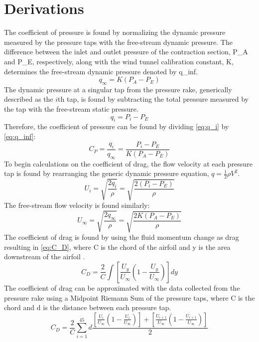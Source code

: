 \section{Derivations} \label{sec:derivations}
The coefficient of pressure is found by normalizing the dynamic pressure measured by the pressure taps with the free-stream dynamic pressure. The difference between the inlet and outlet pressure of the contraction section, \gls{P_A} and \gls{P_E}, respectively, along with the wind tunnel calibration constant, \gls{K}, determines the free-stream dynamic pressure denoted by \gls{q_inf}.
\begin{equation}\label{eq:q_inf}
    q_\infty = K (P_A - P_E)
\end{equation}
The dynamic pressure at a singular tap from the pressure rake, generically described as the $i$th tap, is found by subtracting the total pressure measured by the tap with the free-stream static pressure.
\begin{equation}\label{eq:q_i}
    q_i = P_i - P_E 
\end{equation}
Therefore, the coefficient of pressure can be found by dividing \autoref{eq:q_i} by \autoref{eq:q_inf}:
\begin{equation}\label{eq:C_P}
    C_P = \frac{q_i}{q_\infty} = \frac{P_i - P_E }{K (P_A - P_E)}
\end{equation}
To begin calculations on the coefficient of drag, the flow velocity at each pressure tap is found by rearranging the generic dynamic pressure equation, $q = \frac{1}{2}\rho V^2$.
\begin{equation}\label{eq:U_i}
    U_i = \sqrt{\frac{2 q_i}{\rho}} = \sqrt{\frac{2 (P_i - P_E)}{\rho}}
\end{equation}
The free-stream flow velocity is found similarly: 
\begin{equation}\label{eq:U_inf}
    U_\infty = \sqrt{\frac{2 q_\infty}{\rho}} = \sqrt{\frac{2 K (P_A - P_E)}{\rho}}
\end{equation}
The coefficient of drag is found by using the fluid momentum change as drag resulting in \autoref{eq:C_D}, where \gls{C} is the chord of the airfoil and \gls{y} is the area downstream of the airfoil \citep{lab6-manual}.
\begin{equation}\label{eq:C_D}
    C_D = \frac{2}{C} \int \left[\frac{U_y}{U_\infty}\left(1-\frac{U_y}{U_\infty}\right)\right]dy
\end{equation}
The coefficient of drag can be approximated with the data collected from the pressure rake using a Midpoint Riemann Sum of the pressure taps, where \gls{C} is the chord and \gls{d} is the distance between each pressure tap.
\begin{equation}
    C_D = \frac{2}{C} \sum_{i=1}^{45} d\frac{\left[\frac{U_i}{U_\infty}\left(1-\frac{U_i}{U_\infty}\right)\right] + \left[\frac{U_{i+1}}{U_\infty}\left(1-\frac{U_{i+1}}{U_\infty}\right)\right]}{2}
\end{equation}

